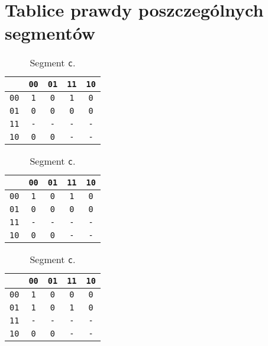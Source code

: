 \documentclass[10pt,a4paper]{article}
\newcommand{\f}[1]{\texttt{#1}}
\begin{document}
\section*{Tablice prawdy poszczególnych segmentów}

\begin{table}[!ht]
  \centering
  \begin{minipage}{0.3\linewidth}
    \centering
    \begin{tabular}{c|cccc}
             & \f{00} & \f{01} & \f{11} & \f{10} \\
      \midrule
      \f{00} &  \f{1} &  \f{0} &  \f{1} &  \f{0} \\
      \f{01} &  \f{0} &  \f{0} &  \f{0} &  \f{0} \\
      \f{11} &  \f{-} &  \f{-} &  \f{-} &  \f{-} \\
      \f{10} &  \f{0} &  \f{0} &  \f{-} &  \f{-} \\
    \end{tabular}
    \caption{Segment \f{a}.}
  \end{minipage}
  \quad
  \begin{minipage}{0.3\linewidth}
    \centering
    \begin{tabular}{c|cccc}
             & \f{00} & \f{01} & \f{11} & \f{10} \\
      \midrule
      \f{00} &  \f{1} &  \f{0} &  \f{1} &  \f{0} \\
      \f{01} &  \f{0} &  \f{0} &  \f{0} &  \f{0} \\
      \f{11} &  \f{-} &  \f{-} &  \f{-} &  \f{-} \\
      \f{10} &  \f{0} &  \f{0} &  \f{-} &  \f{-} \\
    \end{tabular}
    \caption{Segment \f{b}.}
  \end{minipage}
  \quad
  \begin{minipage}{0.3\linewidth}
    \centering
    \begin{tabular}{c|cccc}
             & \f{00} & \f{01} & \f{11} & \f{10} \\
      \midrule
      \f{00} &  \f{1} &  \f{0} &  \f{0} &  \f{0} \\
      \f{01} &  \f{1} &  \f{0} &  \f{1} &  \f{0} \\
      \f{11} &  \f{-} &  \f{-} &  \f{-} &  \f{-} \\
      \f{10} &  \f{0} &  \f{0} &  \f{-} &  \f{-} \\
    \end{tabular}
    \caption{Segment \f{c}.}
  \end{minipage}
\end{table}
\end{document}
